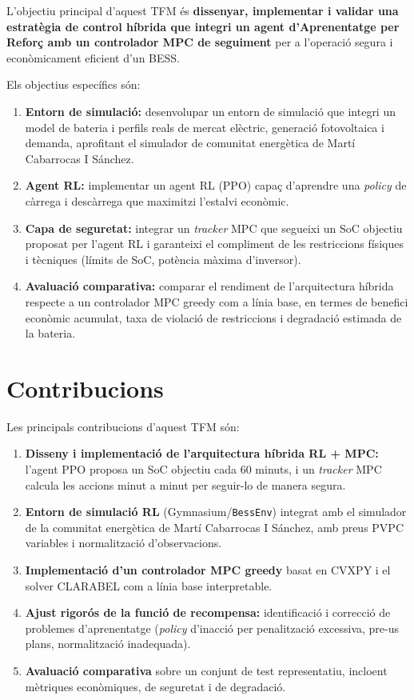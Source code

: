 \documentclass[a4paper,12pt,twoside]{ThesisStyle}
\begin{document}
L'objectiu principal d'aquest TFM és \textbf{dissenyar, implementar i validar una estratègia de control híbrida que integri un agent d'Aprenentatge per Reforç amb un controlador MPC de seguiment} per a l'operació segura i econòmicament eficient d'un BESS.

Els objectius específics són:

\begin{enumerate}
    \item \textbf{Entorn de simulació:} desenvolupar un entorn de simulació que integri un model de bateria i perfils reals de mercat elèctric, generació fotovoltaica i demanda, aprofitant el simulador de comunitat energètica de Martí Cabarrocas I Sánchez.
    \item \textbf{Agent RL:} implementar un agent RL (PPO) capaç d'aprendre una \textit{policy} de càrrega i descàrrega que maximitzi l'estalvi econòmic.
    \item \textbf{Capa de seguretat:} integrar un \textit{tracker} MPC que segueixi un SoC objectiu proposat per l'agent RL i garanteixi el compliment de les restriccions físiques i tècniques (límits de SoC, potència màxima d'inversor).
    \item \textbf{Avaluació comparativa:} comparar el rendiment de l'arquitectura híbrida respecte a un controlador MPC greedy com a línia base, en termes de benefici econòmic acumulat, taxa de violació de restriccions i degradació estimada de la bateria.
\end{enumerate}

\section{Contribucions}

Les principals contribucions d'aquest TFM són:
\begin{enumerate}
    \item \textbf{Disseny i implementació de l'arquitectura híbrida RL + MPC:} l'agent PPO proposa un SoC objectiu cada 60 minuts, i un \textit{tracker} MPC calcula les accions minut a minut per seguir-lo de manera segura.
    \item \textbf{Entorn de simulació RL} (Gymnasium/\texttt{BessEnv}) integrat amb el simulador de la comunitat energètica de Martí Cabarrocas I Sánchez, amb preus PVPC variables i normalització d'observacions.
    \item \textbf{Implementació d'un controlador MPC greedy} basat en CVXPY i el solver CLARABEL com a línia base interpretable.
    \item \textbf{Ajust rigorós de la funció de recompensa:} identificació i correcció de problemes d'aprenentatge (\textit{policy} d'inacció per penalització excessiva, pre-us plans, normalització inadequada).
    \item \textbf{Avaluació comparativa} sobre un conjunt de test representatiu, incloent mètriques econòmiques, de seguretat i de degradació.
\end{enumerate}
\end{document}
